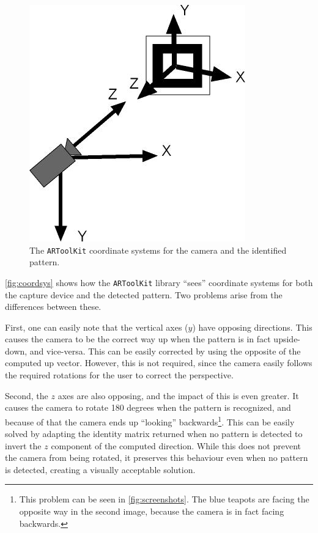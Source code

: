 \documentclass{acmtog}
\begin{document}
\begin{figure}[!htp]
	\begin{center}
		\includegraphics[width=0.6\columnwidth]{images/coordsys.jpg}
	\end{center}
	\caption{The \texttt{ARToolKit} coordinate systems for the camera and the identified pattern.}
	\label{fig:coordsys}
\end{figure}

\autoref{fig:coordsys} shows how the \texttt{ARToolKit} library ``sees'' coordinate systems for both the capture device and the detected pattern. Two problems arise from the differences between these.

First, one can easily note that the vertical axes ($y$) have opposing directions. This causes the camera to be the correct way up when the pattern is in fact upside-down, and vice-versa. This can be easily corrected by using the opposite of the computed up vector. However, this is not required, since the camera easily follows the required rotations for the user to correct the perspective.

Second, the $z$ axes are also opposing, and the impact of this is even greater. It causes the camera to rotate 180 degrees when the pattern is recognized, and because of that the camera ends up ``looking'' backwards\footnote{This problem can be seen in \autoref{fig:screenshots}. The blue teapots are facing the opposite way in the second image, because the camera is in fact facing backwards.}. This can be easily solved by adapting the identity matrix returned when no pattern is detected to invert the $z$ component of the computed direction. While this does not prevent the camera from being rotated, it preserves this behaviour even when no pattern is detected, creating a visually acceptable solution.
\end{document}
